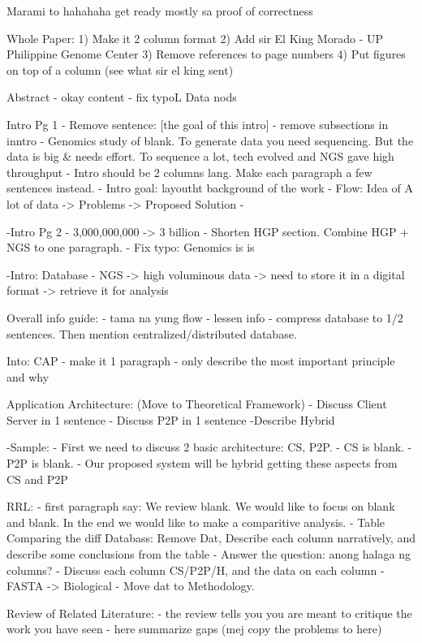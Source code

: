 Marami to hahahaha get ready mostly sa proof of correctness

Whole Paper:
1) Make it 2 column format
2) Add sir El King Morado - UP Philippine Genome Center
3) Remove references to page numbers
4) Put figures on top of a column (see what sir el king sent)

Abstract
- okay content
- fix typoL Data nods

Intro Pg 1
- Remove sentence: [the goal of this intro]
- remove subsections in inntro
- Genomics study of blank. To generate data you need sequencing. But the data is big & needs effort. To sequence a lot, tech evolved and NGS gave high throughput
- Intro should be 2 columns lang. Make each paragraph a few sentences instead.
- Intro goal: layoutht background of the work
- Flow: Idea of A lot of data -> Problems -> Proposed Solution
-

-Intro Pg 2
- 3,000,000,000 -> 3 billion
- Shorten HGP section. Combine HGP + NGS to one paragraph.
- Fix typo: Genomics is is

-Intro: Database
- NGS -> high voluminous data -> need to store it in a digital format -> retrieve it for analysis


Overall info guide: 
- tama na yung flow
- lessen info
- compress database to 1/2 sentences. Then mention centralized/distributed database.

Into: CAP
- make it 1 paragraph
- only describe the most important principle and why

Application Architecture: (Move to Theoretical Framework)
- Discuss Client Server in 1 sentence
- Discuss P2P in 1 sentence
-Describe Hybrid 

-Sample: 
- First we need to discuss 2 basic architecture: CS, P2P. 
- CS is blank. 
- P2P is blank. 
- Our proposed system will be hybrid getting these aspects from CS and P2P

RRL:
- first paragraph say: We review blank. We would like to focus on blank and blank. In the end we would like to make a comparitive analysis. 
- Table Comparing the diff Databass: Remove Dat, Describe each column narratively, and describe some conclusions from the table
- Answer the question: anong halaga ng columns? 
- Discuss each column CS/P2P/H, and the data on each column
- FASTA -> Biological
- Move dat to Methodology.

Review of Related Literature:
- the review tells you you are meant to critique the work you have seen
- here summarize gaps (mej copy the problems to here)


